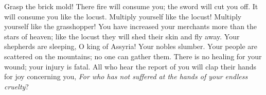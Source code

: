 \begin{biblechapter}
Grasp the brick mold!
\verse There fire will consume you; 
the sword will cut you off. 
It will consume you like the locust.
 Multiply yourself like the locust! 
Multiply yourself like the grasshopper!
\verse You have increased your merchants more than the stars of heaven; 
like the locust they will shed their skin and fly away.
 Your shepherds are sleeping, O king of Assyria! 
Your nobles slumber. 
Your people are scattered on the mountains; 
no one can gather them.
\verse There is no healing for your wound; 
your injury is fatal. 
All who hear the report of you will clap their hands for joy concerning you, 
\textit{For who has not suffered at the hands of your endless cruelty}?
\end{biblechapter}

